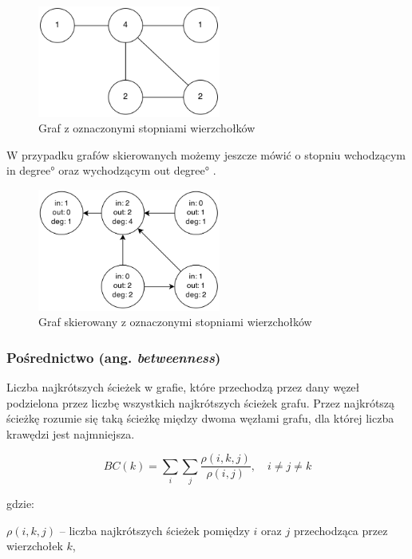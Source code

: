\begin{figure}[ht!]
\centering
\includegraphics[width=60mm]{img/stopien-wierzcholka.png}
\caption{Graf z oznaczonymi stopniami wierzchołków}
\label{image:stopien-wierzcholka}
\end{figure}

W przypadku grafów skierowanych możemy jeszcze mówić o stopniu wchodzącym 
\ang{in degree} oraz wychodzącym \ang{out degree}
.
  
\clearpage
\begin{figure}[ht!]
\centering
\includegraphics[width=60mm]{img/stopien-wierzcholka-skierowany.png}
\caption{Graf skierowany z oznaczonymi stopniami wierzchołków}
\label{image:stopien-wierzcholka-skierowany}
\end{figure}
  
  
\subsubsection{Pośrednictwo (ang. \textit{betweenness}) }  
Liczba najkrótszych ścieżek w grafie, które przechodzą przez dany węzeł podzielona
przez liczbę wszystkich najkrótszych ścieżek grafu. Przez najkrótszą ścieżkę 
rozumie się taką ścieżkę między dwoma węzłami grafu, dla której liczba krawędzi
jest najmniejsza.
  
\begin{equation}
BC(k) = \sum\limits_{i}\sum\limits_{j}\frac{\rho(i, k, j)}{\rho(i, j)}, \quad i \neq j \neq k
\end{equation}

gdzie:

$\rho(i, k, j)$ -- liczba najkrótszych ścieżek pomiędzy $i$ oraz $j$ przechodząca
przez wierzchołek $k$,

